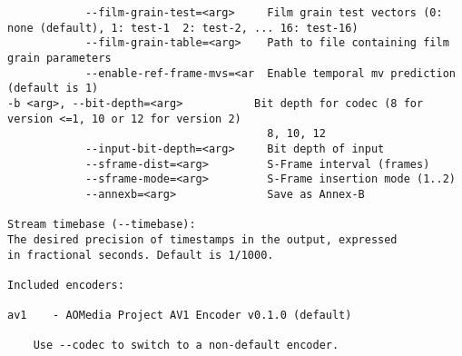 \begin{appendices}
\begin{lstlisting}
            --film-grain-test=<arg>     Film grain test vectors (0: none (default), 1: test-1  2: test-2, ... 16: test-16)
            --film-grain-table=<arg>    Path to file containing film grain parameters
            --enable-ref-frame-mvs=<ar  Enable temporal mv prediction (default is 1)
-b <arg>, --bit-depth=<arg>           Bit depth for codec (8 for version <=1, 10 or 12 for version 2)
                                        8, 10, 12
            --input-bit-depth=<arg>     Bit depth of input
            --sframe-dist=<arg>         S-Frame interval (frames)
            --sframe-mode=<arg>         S-Frame insertion mode (1..2)
            --annexb=<arg>              Save as Annex-B

Stream timebase (--timebase):
The desired precision of timestamps in the output, expressed
in fractional seconds. Default is 1/1000.

Included encoders:

av1    - AOMedia Project AV1 Encoder v0.1.0 (default)

    Use --codec to switch to a non-default encoder.
\end{lstlisting}
\end{appendices}